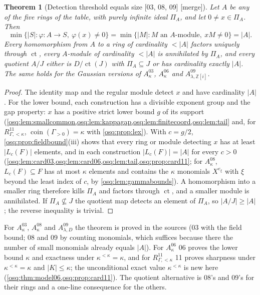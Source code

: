 \documentclass[11pt,letterpaper]{article}
\numberwithin{equation}{section}
\newtheorem{theorem}{Theorem}[section]
\theoremstyle{definition}
\theoremstyle{remark}
\theoremstyle{plain}
\newcommand{\Z}{\mathbb Z}
\newcommand{\ct}{\operatorname{ct}}
\newcommand{\coin}{\operatorname{coin}}
\newcommand{\src}[1]{\textup{\textsf{[#1]}}}
\newcommand{\merge}{\textup{\textsf{[merge]}}}
\begin{document}
\begin{theorem}[Detection threshold equals size \src{03, 08, 09} \merge]\label{osq:thm:thresholds}
Let $A$ be any of the five rings of the table, with purely infinite ideal $\Pi_A$, and let
$0\ne x\in\Pi_A$. Then
\[
 \min\{|S|:\varphi:A\to S,\ \varphi(x)\ne0\}
 =\min\{|M|: M\text{ an }A\text{-module},\ xM\ne0\}=|A| .
\]
Every homomorphism from $A$ to a ring of cardinality $<|A|$ factors uniquely through $\ct$, every
$A$-module of cardinality $<|A|$ is annihilated by $\Pi_A$, and every quotient $A/J$ either is
$D/\ct(J)$ with $\Pi_A\subseteq J$ or has cardinality exactly $|A|$. The same holds for the
Gaussian versions of $A^{03}_\kappa$, $A^{06}_\kappa$ and $A^{09}_{\lambda,\Z[i]}$.
\end{theorem}
\begin{proof}
The identity map and the regular module detect $x$ and have cardinality $|A|$. For the lower
bound, each construction has a divisible exponent group and the gap property: $x$ has a positive
strict lower bound $g$ of its support (\cref{osq:lem:smallcommon,osq:lem:kappagap,osq:lem:finitecoord,osq:lem:tail}
and, for $R^{11}_{\Gamma,<\kappa}$, $\coin(\Gamma_{>0})=\kappa$ with \cref{osq:prop:lex}). With
$c=g/2$, \cref{osq:prop:fieldbound}(iii) shows that every ring or module detecting $x$ has at
least $|L_c(F)|$ elements, and in each construction $|L_c(F)|=|A|$ for every $c>0$
(\cref{osq:lem:card03,osq:lem:card06,osq:lem:tail,osq:prop:card11}; for $A^{08}_\kappa$,
$L_c(F)\subseteq F$ has at most $\kappa$ elements and contains the $\kappa$ monomials $X^{e_\xi}$ with
$\xi$ beyond the least index of $c$, by \cref{osq:lem:gammabounds}). A homomorphism
into a smaller ring therefore kills $\Pi_A$ and factors through $\ct$, and a smaller module is
annihilated. If $\Pi_A\not\subseteq J$ the quotient map detects an element of $\Pi_A$, so
$|A/J|\ge|A|$; the reverse inequality is trivial.
\end{proof}

For $A^{03}_\kappa$, $A^{08}_\kappa$ and $A^{09}_{\lambda,D}$ the theorem is proved in the
sources (03 with the field bound; 08 and 09 by counting monomials, which suffices because there
the number of small monomials already equals $|A|$). For $A^{06}_\kappa$ 06 proves the lower
bound $\kappa$ and exactness under $\kappa^{<\kappa}=\kappa$, and for $R^{11}_{\Gamma,<\kappa}$ 11
proves sharpness under $\kappa^{<\kappa}=\kappa$ and $|K|\le\kappa$; the unconditional exact value
$\kappa^{<\kappa}$ is new here (\cref{osq:thm:model06,osq:prop:card11}). The quotient alternative
is 08's and 09's for their rings and a one-line consequence for the others.
\end{document}
